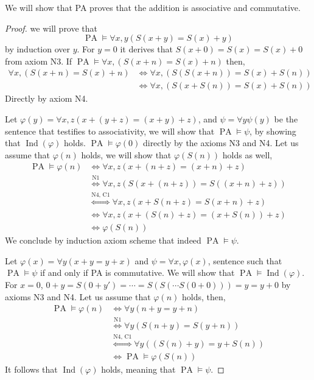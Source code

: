 \question{}
\subquestion{}
We will show that PA proves that the addition is associative and commutative.
\begin{proof}
	we will prove that
	\[
		\operatorname{PA} \models \forall x, y (S(x + y) = S(x) + y)
		\tag{C1}
	\]
	by induction over $y$.
	For $y = 0$ it derives that $S(x + 0) = S(x) = S(x) + 0$ from axiom N3.
	If $\operatorname{PA} \models \forall x, (S(x + n) = S(x) + n)$ then,
	\begin{align*}
		\forall x, (S(x + n) = S(x) + n)
		& \iff \forall x, (S(S(x + n)) = S(x) + S(n)) \\
		& \iff \forall x, (S(x + S(n)) = S(x) + S(n))
	\end{align*}
	Directly by axiom N4.

	Let $\varphi(y) = \forall x, z (x + (y + z) = (x + y) + z)$, and $\psi = \forall y \psi(y)$ be the sentence that testifies to associativity, we will show that $\operatorname{PA} \models \psi$,
	by showing that $\operatorname{Ind}(\varphi)$ holds.
	$\operatorname{PA} \models \varphi(0)$ directly by the axioms N3 and N4.
	Let us assume that $\varphi(n)$ holds, we will show that $\varphi(S(n))$ holds as well,
	\begin{align*}
		\operatorname{PA} \models \varphi(n)
		& \iff \forall x, z (x + (n + z) = (x + n) + z) \\
		& \overset{\text{N1}}{\iff} \forall x, z (S(x + (n + z)) = S((x + n) + z)) \\
		& \overset{\text{N4, C1}}{\iff} \forall x, z (x + S(n + z) = S(x + n) + z) \\
		& \iff \forall x, z (x + (S(n) + z) = (x + S(n)) + z) \\
		& \iff \varphi(S(n))
	\end{align*}
	We conclude by induction axiom scheme that indeed $\operatorname{PA} \models \psi$.

	Let $\varphi(x) = \forall y (x + y = y + x)$ and $\psi = \forall x, \varphi(x)$, sentence such that $\operatorname{PA} \models \psi$ if and only if PA is commutative.
	We will show that $\operatorname{PA} \models \operatorname{Ind}(\varphi)$.
	For $x = 0$, $0 + y = S(0 + y') = \cdots = S(S(\cdots S(0 + 0))) = y = y + 0$ by axioms N3 and N4.
	Let us assume that $\varphi(n)$ holds, then,
	\begin{align*}
		\operatorname{PA} \models \varphi(n)
		& \iff \forall y (n + y = y + n) \\
		& \overset{\text{N1}}{\iff}  \forall y (S(n + y) = S(y + n)) \\
		& \overset{\text{N4, C1}}{\iff}  \forall y ((S(n) + y) = y + S(n)) \\
		& \iff \operatorname{PA} \models \varphi(S(n))
	\end{align*}
	It follows that $\operatorname{Ind}(\varphi)$ holds, meaning that $\operatorname{PA} \models \psi$.
\end{proof}

